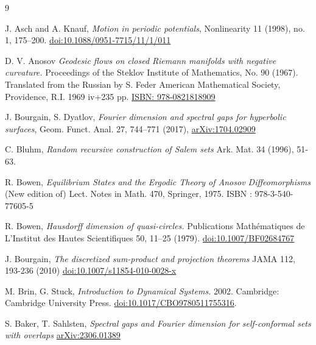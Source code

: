 \documentclass[a4paper]{article}
\theoremstyle{definition}
\begin{document}
\begin{thebibliography}{9}
    




    {J. Asch and A. Knauf}, \emph{Motion in periodic potentials}, Nonlinearity 11 (1998), no. 1, 175–200. \href{https://iopscience.iop.org/article/10.1088/0951-7715/11/1/011}{doi:10.1088/0951-7715/11/1/011}

    {D. V. Anosov}
    \emph{Geodesic flows on closed Riemann manifolds with negative curvature.} Proceedings of the Steklov Institute of Mathematics, No. 90 (1967). Translated from the Russian by S. Feder American Mathematical Society, Providence, R.I. 1969 iv+235 pp.
    \href{hhttps://www.amazon.com/-/eng/manifolds-curvature-Proceedings-Institute-Mathematics/dp/0821818902}{ISBN: 978-0821818909}



     {J. Bourgain, S. Dyatlov}, 
     \emph{Fourier dimension and spectral gaps for hyperbolic surfaces},
     Geom. Funct. Anal. 27, 744–771 (2017),  \href{https://arxiv.org/abs/1704.02909}{arXiv:1704.02909} 


  
    {C. Bluhm},
    \emph{Random recursive construction of Salem sets}
    Ark. Mat. 34 (1996), 51-63.

    {R. Bowen},
    \emph{Equilibrium States and the Ergodic Theory of Anosov Diffeomorphisms}
    (New edition of) Lect. Notes in Math. 470, Springer, 1975. ISBN : 978-3-540-77605-5


    {R. Bowen},
    \emph{Hausdorff dimension of quasi-circles.}
    Publications Mathématiques de L’Institut des Hautes Scientifiques 50, 11–25 (1979). \href{https://doi.org/10.1007/BF02684767}{doi:10.1007/BF02684767}



    {J. Bourgain},
    \emph{The discretized sum-product and projection theorems} 
    JAMA 112, 193-236 (2010)  \href{https://doi.org/10.1007/s11854-010-0028-x}{doi:10.1007/s11854-010-0028-x}


    {M. Brin, G. Stuck},
    \emph{Introduction to Dynamical Systems.} 
     2002. Cambridge: Cambridge University Press. \href{https://doi.org/10.1017/CBO9780511755316}{doi:10.1017/CBO9780511755316}.

    {S. Baker, T. Sahlsten,}
    \emph{Spectral gaps and Fourier dimension for self-conformal sets with overlaps}
    \href{https://arxiv.org/abs/2306.01389}{arXiv:2306.01389}



\end{thebibliography}
\end{document}
